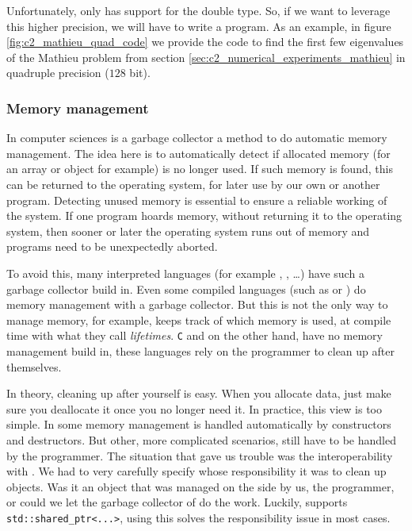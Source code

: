 Unfortunately, \lpython{} only has support for the double type. So, if we want to leverage this higher precision, we will have to write a \cpp{} program. As an example, in figure \ref{fig:c2_mathieu_quad_code} we provide the code to find the first few eigenvalues of the Mathieu problem from section \ref{sec:c2_numerical_experiments_mathieu} in quadruple precision ($128$ bit).

\subsubsection{Memory management}

In computer sciences is a garbage collector a method to do automatic memory management. The idea here is to automatically detect if allocated memory (for an array or object for example) is no longer used. If such memory is found, this can be returned to the operating system, for later use by our own or another program. Detecting unused memory is essential to ensure a reliable working of the system. If one program hoards memory, without returning it to the operating system, then sooner or later the operating system runs out of memory and programs need to be unexpectedly aborted.

To avoid this, many interpreted languages (for example \lpython{}, \javascript{}, \matlab{}\dots) have such a garbage collector build in. Even some compiled languages (such as \java{} or \csharp{}) do memory management with a garbage collector. But this is not the only way to manage memory, \rust{} for example, keeps track of which memory is used, at compile time with what they call \emph{lifetimes}. \texttt{C} and \cpp on the other hand, have no memory management build in, these languages rely on the programmer to clean up after themselves.

In theory, cleaning up after yourself is easy. When you allocate data, just make sure you deallocate it once you no longer need it. In practice, this view is too simple. In \cpp{} some memory management is handled automatically by constructors and destructors. But other, more complicated scenarios, still have to be handled by the programmer. The situation that gave us trouble was the interoperability with \lpython{}. We had to very carefully specify whose responsibility it was to clean up objects. Was it an object that was managed on the \cpp{} side by us, the programmer, or could we let the garbage collector of \lpython{} do the work. Luckily, \pybind{} supports \texttt{std::shared\_ptr<...>}, using this solves the responsibility issue in most cases.


